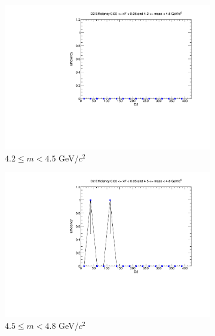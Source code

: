 \documentclass[11pt]{article}
\begin{document}
\begin{figure}[p]
    \centering
    \begin{subfigure}[b]{0.32\textwidth}
        \centering
        \includegraphics[width=\textwidth]{./kTrackerEfficiencyPlots/D2_Efficiency_xF0_mass0.pdf}
        \caption{$4.2 \leq m < 4.5$ GeV/$c^2$}
    \end{subfigure}\hfill
    \begin{subfigure}[b]{0.32\textwidth}
        \centering
        \includegraphics[width=\textwidth]{./kTrackerEfficiencyPlots/D2_Efficiency_xF0_mass1.pdf}
        \caption{$4.5 \leq m < 4.8$ GeV/$c^2$}
    \end{subfigure}\hfill
    \begin{subfigure}[b]{0.32\textwidth}
        \centering

\end{subfigure}
\end{figure}
\end{document}
